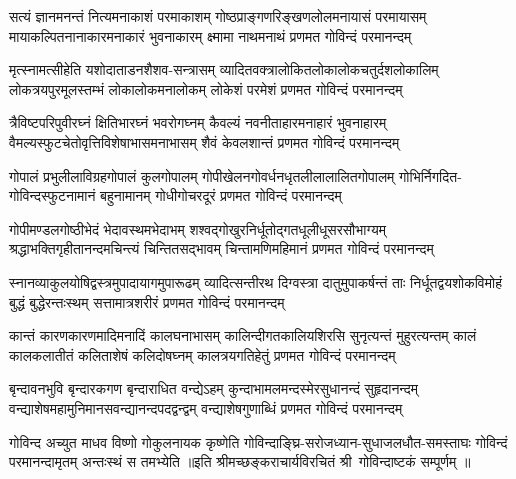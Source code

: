 
\fourlineindentedshloka
{सत्यं ज्ञानमनन्तं नित्यमनाकाशं परमाकाशम्}
{गोष्ठप्राङ्गणरिङ्खणलोलमनायासं परमायासम्}
{मायाकल्पितनानाकारमनाकारं भुवनाकारम्}
{क्ष्मामा नाथमनाथं प्रणमत गोविन्दं परमानन्दम्}

\fourlineindentedshloka
{मृत्स्नामत्सीहेति यशोदाताडनशैशव-सन्त्रासम्}
{व्यादितवक्त्रालोकितलोकालोकचतुर्दशलोकालिम्}
{लोकत्रयपुरमूलस्तम्भं लोकालोकमनालोकम्}
{लोकेशं परमेशं प्रणमत गोविन्दं परमानन्दम्}

\fourlineindentedshloka
{त्रैविष्टपरिपुवीरघ्नं क्षितिभारघ्नं भवरोगघ्नम्}
{कैवल्यं नवनीताहारमनाहारं भुवनाहारम्}
{वैमल्यस्फुटचेतोवृत्तिविशेषाभासमनाभासम्}
{शैवं केवलशान्तं प्रणमत गोविन्दं परमानन्दम्}

\fourlineindentedshloka
{गोपालं प्रभुलीलाविग्रहगोपालं कुलगोपालम्}
{गोपीखेलनगोवर्धनधृतलीलालालितगोपालम्}
{गोभिर्निगदित-गोविन्दस्फुटनामानं बहुनामानम्}
{गोधीगोचरदूरं प्रणमत गोविन्दं परमानन्दम्}

\fourlineindentedshloka
{गोपीमण्डलगोष्ठीभेदं भेदावस्थमभेदाभम्}
{शश्वद्गोखुरनिर्धूतोद्गतधूलीधूसरसौभाग्यम्}
{श्रद्धाभक्तिगृहीतानन्दमचिन्त्यं चिन्तितसद्भावम्}
{चिन्तामणिमहिमानं प्रणमत गोविन्दं परमानन्दम्}

\fourlineindentedshloka
{स्नानव्याकुलयोषिद्वस्त्रमुपादायागमुपारूढम्}
{व्यादित्सन्तीरथ दिग्वस्त्रा दातुमुपाकर्षन्तं ताः}
{निर्धूतद्वयशोकविमोहं बुद्धं बुद्धेरन्तःस्थम्}
{सत्तामात्रशरीरं प्रणमत गोविन्दं परमानन्दम्}

\fourlineindentedshloka
{कान्तं कारणकारणमादिमनादिं कालघनाभासम्}
{कालिन्दीगतकालियशिरसि सुनृत्यन्तं मुहुरत्यन्तम्}
{कालं कालकलातीतं कलिताशेषं कलिदोषघ्नम्}
{कालत्रयगतिहेतुं प्रणमत गोविन्दं परमानन्दम्}

\fourlineindentedshloka
{बृन्दावनभुवि बृन्दारकगण बृन्दाराधित वन्द्येऽहम्}
{कुन्दाभामलमन्दस्मेरसुधानन्दं सुहृदानन्दम्}
{वन्द्याशेषमहामुनिमानसवन्द्यानन्दपदद्वन्द्वम्}
{वन्द्याशेषगुणाब्धिं प्रणमत गोविन्दं परमानन्दम्}

{गोविन्द अच्युत माधव विष्णो गोकुलनायक कृष्णेति}
{गोविन्दाङ्घ्रि-सरोजध्यान-सुधाजलधौत-समस्ताघः}
{गोविन्दं परमानन्दामृतम् अन्तःस्थं स तमभ्येति}
{॥इति श्रीमच्छङ्कराचार्यविरचितं श्री~गोविन्दाष्टकं सम्पूर्णम् ॥}